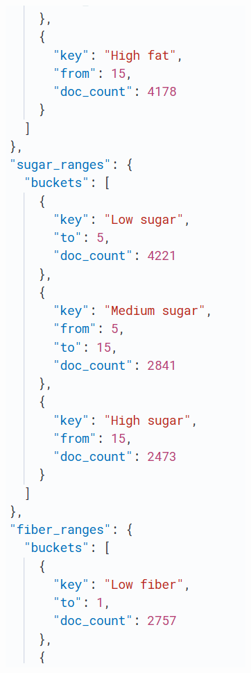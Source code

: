 \begin{enumerate}
\begin{figure}[h!]
\begin{minipage}{0.25\textwidth}
    \end{minipage}%
    \hspace{0.05\textwidth}
    \begin{minipage}{0.25\textwidth}
        \centering
        \includegraphics[width=\textwidth]{Report/ReportLatex/Images/ElasticsearchResults/calories2.png}

\end{minipage}
\end{figure}
\end{enumerate}
